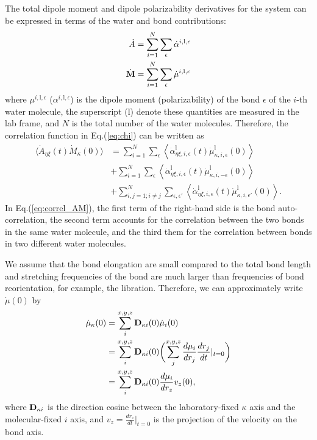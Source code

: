  The total dipole moment and dipole polarizability derivatives for the system can be expressed in terms of the water and bond contributions:
\begin{align}
 \dot{A}&=\sum_{i=1}^N \sum_{\epsilon}\dot{\alpha}^{i,\text{l},\epsilon} \\ 
 \dot{{\bf M}}&=\sum_{i=1}^N \sum_{\epsilon}\dot{\mu}^{i,\text{l},\epsilon} 
 \label{eq:A-M}
\end{align}
where ${\mu}^{i,\text{l},\epsilon}$ (${\alpha}^{i,\text{l},\epsilon}$) is the dipole moment (polarizability)
of the bond $\epsilon$ of the $i$-th water molecule, the superscript (l) denote these quantities are measured in the 
lab frame, and $N$ is the total number of the water molecules.
Therefore, the correlation function in Eq.\thinspace(\ref{eq:chi}) can be written as 
\begin{align}
  \langle\dot{A}_{\eta\xi}(t)\dot{M}_{\kappa}(0)\rangle 
    &=\sum_{i=1}^N \sum_{\epsilon}\left\langle\dot{\alpha}_{\eta\xi,i,\epsilon}^{\text{l}}(t)\dot{\mu}_{\kappa,i,\epsilon}^{\text{l}}(0)\right\rangle \nonumber \\ 
    &+\sum_{i=1}^N \sum_{\epsilon}\left\langle\dot{\alpha}_{\eta\xi,i,\epsilon}^{\text{l}}(t)\dot{\mu}_{\kappa,i,-\epsilon}^{\text{l}}(0)\right\rangle \nonumber \\
    &+\sum_{i,j=1;i\neq j}^N \sum_{\epsilon,\epsilon'}\left\langle\dot{\alpha}_{\eta\xi,i,\epsilon}^{\text{l}}(t)\dot{\mu}_{\kappa,i,\epsilon'}^{\text{l}}(0)\right\rangle.
 \label{eq:correl_AM}
 \end{align}
In Eq.\thinspace(\ref{eq:correl_AM}), the first term of the right-hand side is the bond auto-correlation, the second term accounts 
for the correlation between the two bonds in the same water molecule, and the third them for the correlation between 
bonds in two different water molecules.
 
We assume that the bond elongation are small compared to the total bond length and stretching frequencies of the bond are 
much larger than frequencies of bond reorientation, for example, the libration.
Therefore, we can approximately write ${\dot\mu}(0)$ by 
\begin{align}
    \dot\mu_{\kappa}(0)&=\sum_i^{x,y,z}{\bf{D}}_{\kappa i}(0)\dot{\mu}_i(0) \nonumber \\
                       &=\sum_i^{x,y,z}{\bf{D}}_{\kappa i}(0)\biggl(\sum_j^{x,y,z}\frac{d\mu_i}{d r_j}\frac{d{r}_j}{dt}|_{t=0}\biggr) \nonumber \\
                       &=\sum_{i}^{x,y,z}{\bf{D}}_{\kappa i}(0)\frac{d\mu_i}{dr_z}v_z(0),
    \label{eq:dot_mu}
 \end{align}
where ${\bf D}_{\kappa i}$ is the direction cosine between the laboratory-fixed $\kappa$ axis and the molecular-fixed $i$ axis,
and $v_z=\frac{d{r}_z}{dt}|_{t=0}$ is the projection of the velocity on the bond axis.

